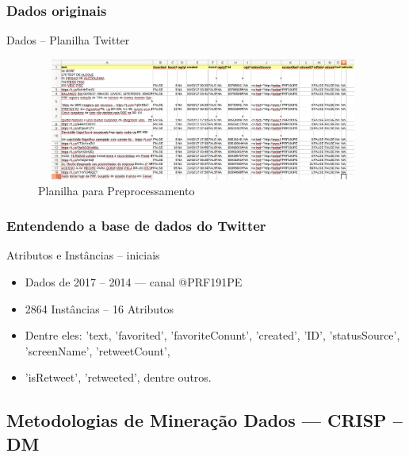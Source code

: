 \documentclass[11pt]{beamer}
\begin{document}
\begin{frame}\frametitle{ Dados originais}
	\transblindsvertical[duration=2, direction=25]
	\begin{block}{ Dados -- Planilha Twitter}
		\begin{figure}[!ht]
			\centering %
			\caption{Planilha para Preprocessamento}
			\includegraphics[width=110mm, height=40mm]{Figuras/BigData/tweetPRF.png}
		\end{figure}
	\end{block}
\end{frame}

\begin{frame}\frametitle{ Entendendo a base de dados do Twitter}
	\begin{exampleblock}{Atributos e Instâncias -- iniciais}
		\begin{itemize}
			\item Dados de 2017 -- 2014 --- canal @PRF191PE
			\pause
			\item 2864 Instâncias -- 16 Atributos
			\pause
			\item Dentre eles: 'text, 'favorited', 'favoriteConunt', 'created', 'ID', 'statusSource', 'screenName', 'retweetCount',
			\pause
			\item 'isRetweet', 'retweeted', dentre outros.		
		\end{itemize}
	\end{exampleblock}
\end{frame}


\subsection{ Metodologias de Mineração Dados --- CRISP -- DM}
\end{document}
